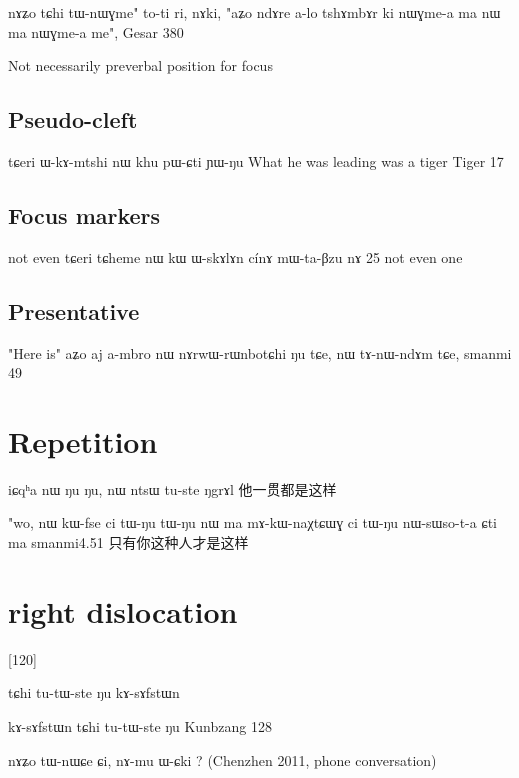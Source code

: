 \documentclass[oldfontcommands,oneside,a4paper,11pt]{memoir}
\begin{document}
nɤʑo	tɕhi	tɯ-nɯɣme"	to-ti	ri,
	nɤki,	"aʑo	ndɤre	a-lo	tshɤmbɤr	ki	nɯɣme-a	ma	nɯ	ma	nɯɣme-a	me",
Gesar 380





Not necessarily preverbal position for focus

\subsection{Pseudo-cleft}

tɕeri ɯ-kɤ-mtshi nɯ khu pɯ-ɕti ɲɯ-ŋu 
What he was leading was a tiger
Tiger 17

\subsection{Focus markers}
not even
tɕeri	tɕheme	nɯ	kɯ	ɯ-skɤlɤn	cínɤ	mɯ-ta-βzu	nɤ
25
not even one



\subsection{Presentative}
"Here is"
aʑo	aj	a-mbro	nɯ	nɤrwɯ-rɯnbotɕhi	ŋu	tɕe,	nɯ	tɤ-nɯ-ndɤm	tɕe,
smanmi 49


\section{Repetition}

iɕqʰa nɯ ŋu ŋu, nɯ ntsɯ tu-ste ŋgrɤl
他一贯都是这样



"wo, nɯ kɯ-fse ci tɯ-ŋu tɯ-ŋu nɯ ma  mɤ-kɯ-naχtɕɯɣ ci tɯ-ŋu nɯ-sɯso-t-a ɕti ma
smanmi4.51
只有你这种人才是这样


\section{right dislocation}

\citet{creissels06sgit2}[120]

tɕhi	tu-tɯ-ste	ŋu	kɤ-sɤfstɯn


kɤ-sɤfstɯn tɕhi	tu-tɯ-ste	ŋu	
Kunbzang 128

nɤʑo tɯ-nɯɕe ɕi, nɤ-mu ɯ-ɕki ?
(Chenzhen 2011, phone conversation)
\end{document}

